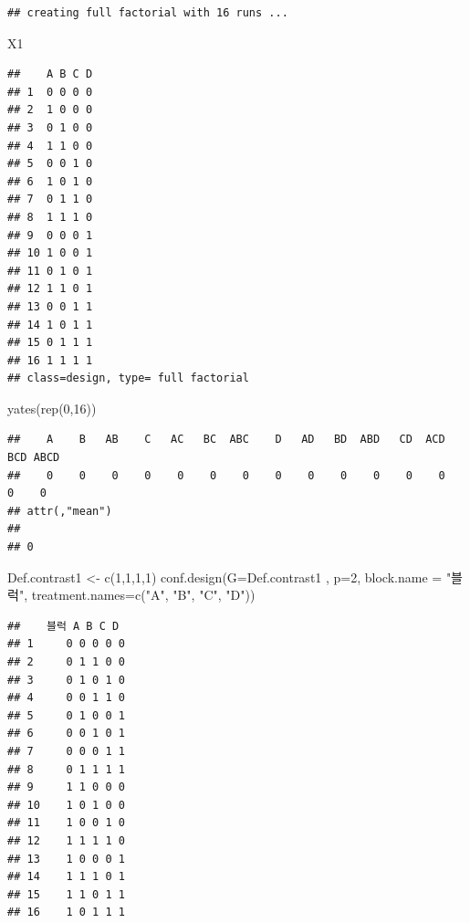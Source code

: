 \documentclass[
]{book}
\newenvironment{Shaded}{\begin{snugshade}}{\end{snugshade}}
\newcommand{\AttributeTok}[1]{\textcolor[rgb]{0.77,0.63,0.00}{#1}}
\newcommand{\DecValTok}[1]{\textcolor[rgb]{0.00,0.00,0.81}{#1}}
\newcommand{\FunctionTok}[1]{\textcolor[rgb]{0.00,0.00,0.00}{#1}}
\newcommand{\NormalTok}[1]{#1}
\newcommand{\OtherTok}[1]{\textcolor[rgb]{0.56,0.35,0.01}{#1}}
\newcommand{\StringTok}[1]{\textcolor[rgb]{0.31,0.60,0.02}{#1}}
\begin{document}
\begin{verbatim}
## creating full factorial with 16 runs ...
\end{verbatim}

\begin{Shaded}
\begin{Highlighting}[]
\NormalTok{X1}
\end{Highlighting}
\end{Shaded}

\begin{verbatim}
##    A B C D
## 1  0 0 0 0
## 2  1 0 0 0
## 3  0 1 0 0
## 4  1 1 0 0
## 5  0 0 1 0
## 6  1 0 1 0
## 7  0 1 1 0
## 8  1 1 1 0
## 9  0 0 0 1
## 10 1 0 0 1
## 11 0 1 0 1
## 12 1 1 0 1
## 13 0 0 1 1
## 14 1 0 1 1
## 15 0 1 1 1
## 16 1 1 1 1
## class=design, type= full factorial
\end{verbatim}

\begin{Shaded}
\begin{Highlighting}[]
\FunctionTok{yates}\NormalTok{(}\FunctionTok{rep}\NormalTok{(}\DecValTok{0}\NormalTok{,}\DecValTok{16}\NormalTok{))}
\end{Highlighting}
\end{Shaded}

\begin{verbatim}
##    A    B   AB    C   AC   BC  ABC    D   AD   BD  ABD   CD  ACD  BCD ABCD 
##    0    0    0    0    0    0    0    0    0    0    0    0    0    0    0 
## attr(,"mean")
##   
## 0
\end{verbatim}

\begin{Shaded}
\begin{Highlighting}[]
\NormalTok{Def.contrast1 }\OtherTok{\textless{}{-}} \FunctionTok{c}\NormalTok{(}\DecValTok{1}\NormalTok{,}\DecValTok{1}\NormalTok{,}\DecValTok{1}\NormalTok{,}\DecValTok{1}\NormalTok{)}
\FunctionTok{conf.design}\NormalTok{(}\AttributeTok{G=}\NormalTok{Def.contrast1 , }\AttributeTok{p=}\DecValTok{2}\NormalTok{, }\AttributeTok{block.name =} \StringTok{"블럭"}\NormalTok{, }\AttributeTok{treatment.names=}\FunctionTok{c}\NormalTok{(}\StringTok{"A"}\NormalTok{, }\StringTok{"B"}\NormalTok{, }\StringTok{"C"}\NormalTok{, }\StringTok{"D"}\NormalTok{))}
\end{Highlighting}
\end{Shaded}

\begin{verbatim}
##    블럭 A B C D
## 1     0 0 0 0 0
## 2     0 1 1 0 0
## 3     0 1 0 1 0
## 4     0 0 1 1 0
## 5     0 1 0 0 1
## 6     0 0 1 0 1
## 7     0 0 0 1 1
## 8     0 1 1 1 1
## 9     1 1 0 0 0
## 10    1 0 1 0 0
## 11    1 0 0 1 0
## 12    1 1 1 1 0
## 13    1 0 0 0 1
## 14    1 1 1 0 1
## 15    1 1 0 1 1
## 16    1 0 1 1 1
\end{verbatim}
\end{document}

